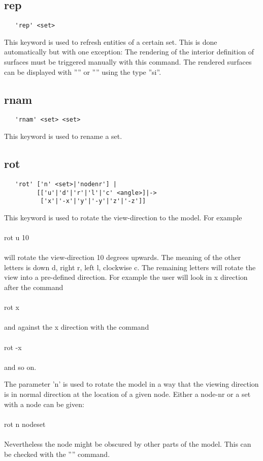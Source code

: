 \documentclass{article}
\begin{document}
\subsection{\label{rep}rep}
\begin{verbatim}
   'rep' <set>  
\end{verbatim}
This keyword is used to refresh entities of a certain set. This is done automatically but with one exception: The rendering of the interior definition of surfaces must be triggered manually with this command. The rendered surfaces can be displayed with '''' or  '''' using the type ''si''.

\subsection{\label{rnam}rnam}
\begin{verbatim}
   'rnam' <set> <set>  
\end{verbatim}
This keyword is used to rename a set.

\subsection{\label{rot}rot}
\begin{verbatim}
   'rot' ['n' <set>|'nodenr'] |
         [['u'|'d'|'r'|'l'|'c' <angle>]|->
          ['x'|'-x'|'y'|'-y'|'z'|'-z']]
\end{verbatim}
This keyword is used to rotate the view-direction to the model. For example\\\\rot u 10\\\\will rotate the view-direction 10 degrees upwards. The meaning of the other letters is down d, right r, left l, clockwise c. The remaining letters will rotate the view into a pre-defined direction. For example the user will look in x direction after the command\\\\rot x\\\\and against the x direction with the command\\\\rot -x\\\\and so on.

The parameter 'n' is used to rotate the model in a way that the viewing direction is in normal direction at the location of a given node. Either a node-nr or a set with a node can be given:\\\\rot n nodeset\\\\Nevertheless the node might be obscured by other parts of the model. This can be checked with the '''' command.
\end{document}

